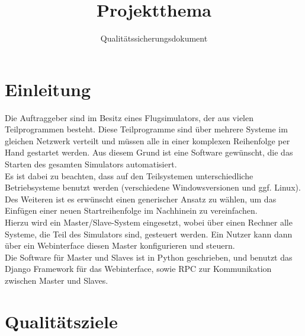 \documentclass[accentcolor=tud9c,12pt,paper=a4]{tudreport}
\title{Projektthema}
\subtitle{Qualitätssicherungsdokument}
\begin{document}
	\maketitle
	\tableofcontents

	\chapter{Einleitung}
		Die Auftraggeber sind im Besitz eines Flugsimulators, der aus vielen 
		Teilprogrammen besteht. Diese Teilprogramme sind über mehrere Systeme im
		gleichen Netzwerk verteilt und müssen alle in einer komplexen Reihenfolge per Hand 
		gestartet werden. Aus diesem Grund ist eine Software gewünscht, die das Starten 
		des gesamten Simulators automatisiert.\\[5pt]
		Es ist dabei zu beachten, dass auf den Teilsystemen unterschiedliche 
		Betriebsysteme benutzt werden (verschiedene Windowsversionen und ggf. Linux). 
		Des Weiteren ist es erwünscht einen generischer Ansatz zu wählen, um das Einfügen 
		einer neuen Startreihenfolge im Nachhinein zu vereinfachen.\\[5pt]
		Hierzu wird ein Master/Slave-System eingesetzt, wobei über einen Rechner alle 
		Systeme, die Teil des Simulators sind, gesteuert werden. Ein Nutzer kann dann über
		ein Webinterface diesen Master konfigurieren und steuern.\\[5pt]
		Die Software für Master und Slaves ist in Python geschrieben, und benutzt
		das Django Framework für das Webinterface, sowie RPC zur Kommunikation zwischen 
		Master und Slaves.
		

	\chapter{Qualitätsziele}
\end{document}
